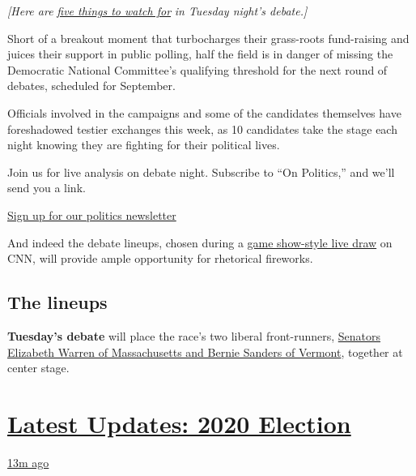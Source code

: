 \emph{{[}Here are}
\href{https://www.nytimes3xbfgragh.onion/2019/07/30/us/politics/democratic-debate-time.html}{\emph{five
things to watch for}} \emph{in Tuesday night's debate.{]}}

Short of a breakout moment that turbocharges their grass-roots
fund-raising and juices their support in public polling, half the field
is in danger of missing the Democratic National Committee's qualifying
threshold for the next round of debates, scheduled for September.

Officials involved in the campaigns and some of the candidates
themselves have foreshadowed testier exchanges this week, as 10
candidates take the stage each night knowing they are fighting for their
political lives.

Join us for live analysis on debate night. Subscribe to ``On Politics,''
and we'll send you a link.

\href{https://www.nytimes3xbfgragh.onion/newsletters/politics}{Sign up
for our politics newsletter}

And indeed the debate lineups, chosen during a
\href{https://www.nytimes3xbfgragh.onion/2019/07/18/us/politics/next-democratic-debate-cnn.html}{game
show-style live draw} on CNN, will provide ample opportunity for
rhetorical fireworks.

\hypertarget{the-lineups}{%
\subsection{The lineups}\label{the-lineups}}

\textbf{Tuesday's debate} will place the race's two liberal
front-runners,
\href{https://www.nytimes3xbfgragh.onion/2019/07/30/us/politics/bernie-sanders-elizabeth-warren.html}{Senators
Elizabeth Warren of Massachusetts and Bernie Sanders of Vermont},
together at center stage.

\hypertarget{latest-updates-2020-election}{%
\section{\texorpdfstring{\href{https://www.nytimes3xbfgragh.onion/live/2020/08/21/us/dnc-convention-election?action=click\&pgtype=Article\&state=default\&region=MAIN_CONTENT_1\&context=storylines_live_updates}{Latest
Updates: 2020
Election}}{Latest Updates: 2020 Election}}\label{latest-updates-2020-election}}

\href{https://www.nytimes3xbfgragh.onion/live/2020/08/21/us/dnc-convention-election?action=click\&pgtype=Article\&state=default\&region=MAIN_CONTENT_1\&context=storylines_live_updates\#postmaster-general-dejoy-testifies-before-the-senate-this-morning}{13m
ago}

